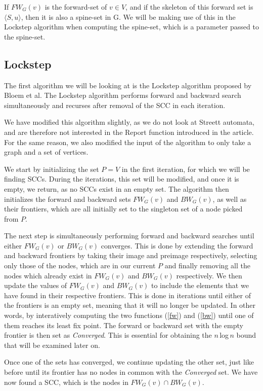 \documentclass[../master/master.tex]{subfiles}
\newcommand{\FW}[2][G]{\ensuremath{FW_{#1}(#2)}}
\newcommand{\BW}[2][G]{\ensuremath{BW_{#1}(#2)}}
\newcommand{\pair}[2]{\ensuremath{\langle #1, #2\rangle}}
\begin{document}
If \FW{v} is the forward-set of $v \in V$, and if the skeleton of this forward set is \pair{S}{u}, then it is also a spine-set in G. We will be making use of this in the Lockstep algorithm when computing the spine-set, which is a parameter passed to the spine-set. 

\subsection{Lockstep}
The first algorithm we will be looking at is the Lockstep algorithm proposed by Bloem et al. \cite{lockstep} The Lockstep algorithm performs forward and backward search simultaneously and recurses after removal of the SCC in each iteration.

We have modified this algorithm slightly, as we do not look at Streett automata, and are therefore not interested in the Report function introduced in the article. For the same reason, we also modified the input of the algorithm to only take a graph and a set of vertices. 

We start by initializing the set $P=V$ in the first iteration, for which we will be finding SCCs. During the iterations, this set will be modified, and once it is empty, we return, as no SCCs exist in an empty set. The algorithm then initializes the forward and backward sets \FW{v} and \BW{v}, as well as their frontiers, which are all initially set to the singleton set of a node picked from $P$.

The next step is simultaneously performing forward and backward searches until either \FW{v} or \BW{v} converges. This is done by extending the forward and backward frontiers by taking their image and preimage respectively, selecting only those of the nodes, which are in our current $P$ and finally removing all the nodes which already exist in \FW{v} and \BW{v} respectively. We then update the values of \FW{v} and \BW{v} to include the elements that we have found in their respective frontiers. This is done in iterations until either of the frontiers is an empty set, meaning that it will no longer be updated.
In other words, by interatively computing the two functions (\ref{fw}) and (\ref{bw}) until one of them reaches its least fix point. The forward or backward set with the empty frontier is then set as \emph{Converged}. This is essential for obtaining the $n$\,log\,$n$ bound that will be examined later on.

Once one of the sets has converged, we continue updating the other set, just like before until its frontier has no nodes in common with the \emph{Converged} set. 
We have now found a SCC, which is the nodes in $\FW{v}\cap\BW{v}$. 
\end{document}
